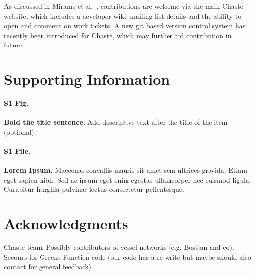 \documentclass[10pt,letterpaper]{article}
\begin{document}
As discussed in Mirams et al.~\cite{Mirams2013}, contributions are welcome via the main Chaste website, which includes a developer wiki, mailing list details and the ability to open and comment on work tickets. A new git based version control system has recently been introduced for Chaste, which may further aid contribution in future.


\section*{Supporting Information}

\paragraph*{S1 Fig.}
\label{S1_Fig}
{\bf Bold the title sentence.} Add descriptive text after the title of the item (optional).

\paragraph*{S1 File.}
\label{S1_File}
{\bf Lorem Ipsum.}  Maecenas convallis mauris sit amet sem ultrices gravida. Etiam eget sapien nibh. Sed ac ipsum eget enim egestas ullamcorper nec euismod ligula. Curabitur fringilla pulvinar lectus consectetur pellentesque.

\section*{Acknowledgments}
Chaste team. Possibly contributors of vessel networks (e.g. Bostjan and co). Secomb for Greens Function code (our code has a re-write but maybe should also contact for general feedback).

\nolinenumbers
\end{document}
